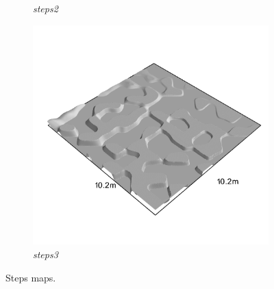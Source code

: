 \documentclass[../document.tex]{subfiles}
\begin{document}
\begin{figure}[H]
\begin{subfigure}[b]{0.23\linewidth}
            \caption{\emph{steps2}}
            \end{subfigure}    
          \begin{subfigure}[b]{0.23\textwidth}
            \includegraphics[width=\textwidth]{../img/hm3d_borders/steps3.png}
            \caption{\emph{steps3}}
        \end{subfigure}    
    \caption{Steps maps.}
\end{figure}
\end{document}
